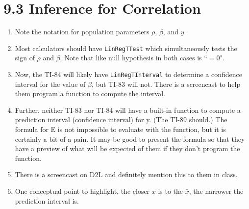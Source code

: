 \documentclass{article}
\begin{document}
\section*{9.3 Inference for Correlation}

\begin{enumerate}

    \item Note the notation for population parameters $\rho$, $\beta$, and  $y$.
    
    \item Most calculators should have \texttt{LinRegTTest} which simultaneously tests the sign of $\rho$ and $\beta$. Note that like null hypothesis in both cases is ``$= 0$".
    
    \item Now, the TI-84 will likely have \texttt{LinRegTInterval} to determine a confidence interval for the value of $\beta$, but TI-83 will not. There is a screencast to help them program a function to compute the interval.
    
    \item Further, neither TI-83 nor TI-84 will have a built-in function to compute a prediction interval (confidence interval) for y. (The TI-89 should.) The formula for E is not impossible to evaluate with the function, but it is certainly a bit of a pain. It may be good to present the formula so that they have a preview of what will be expected of them if they don’t program the function.
    
    \item There is a screencast on D2L and definitely mention this to them in class.
    
    \item One conceptual point to highlight, the closer $x$ is to the $\bar{x}$, the narrower the prediction interval is.

\end{enumerate}
\end{document}
